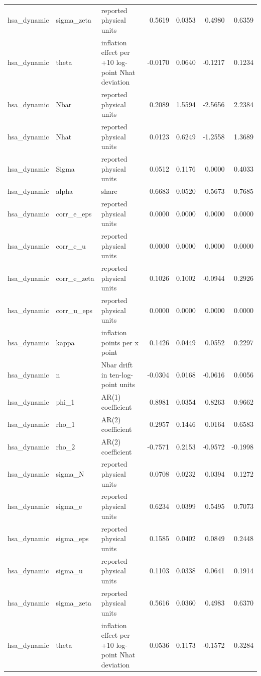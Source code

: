 \begin{tabular}{lllrrrr}
hsa\_dynamic & sigma\_zeta & reported physical units & 0.5619 & 0.0353 & 0.4980 & 0.6359 \\
hsa\_dynamic & theta & inflation effect per +10 log-point Nhat deviation & -0.0170 & 0.0640 & -0.1217 & 0.1234 \\
hsa\_dynamic & Nbar & reported physical units & 0.2089 & 1.5594 & -2.5656 & 2.2384 \\
hsa\_dynamic & Nhat & reported physical units & 0.0123 & 0.6249 & -1.2558 & 1.3689 \\
hsa\_dynamic & Sigma & reported physical units & 0.0512 & 0.1176 & 0.0000 & 0.4033 \\
hsa\_dynamic & alpha & share & 0.6683 & 0.0520 & 0.5673 & 0.7685 \\
hsa\_dynamic & corr\_e\_eps & reported physical units & 0.0000 & 0.0000 & 0.0000 & 0.0000 \\
hsa\_dynamic & corr\_e\_u & reported physical units & 0.0000 & 0.0000 & 0.0000 & 0.0000 \\
hsa\_dynamic & corr\_e\_zeta & reported physical units & 0.1026 & 0.1002 & -0.0944 & 0.2926 \\
hsa\_dynamic & corr\_u\_eps & reported physical units & 0.0000 & 0.0000 & 0.0000 & 0.0000 \\
hsa\_dynamic & kappa & inflation points per x point & 0.1426 & 0.0449 & 0.0552 & 0.2297 \\
hsa\_dynamic & n & Nbar drift in ten-log-point units & -0.0304 & 0.0168 & -0.0616 & 0.0056 \\
hsa\_dynamic & phi\_1 & AR(1) coefficient & 0.8981 & 0.0354 & 0.8263 & 0.9662 \\
hsa\_dynamic & rho\_1 & AR(2) coefficient & 0.2957 & 0.1446 & 0.0164 & 0.6583 \\
hsa\_dynamic & rho\_2 & AR(2) coefficient & -0.7571 & 0.2153 & -0.9572 & -0.1998 \\
hsa\_dynamic & sigma\_N & reported physical units & 0.0708 & 0.0232 & 0.0394 & 0.1272 \\
hsa\_dynamic & sigma\_e & reported physical units & 0.6234 & 0.0399 & 0.5495 & 0.7073 \\
hsa\_dynamic & sigma\_eps & reported physical units & 0.1585 & 0.0402 & 0.0849 & 0.2448 \\
hsa\_dynamic & sigma\_u & reported physical units & 0.1103 & 0.0338 & 0.0641 & 0.1914 \\
hsa\_dynamic & sigma\_zeta & reported physical units & 0.5616 & 0.0360 & 0.4983 & 0.6370 \\
hsa\_dynamic & theta & inflation effect per +10 log-point Nhat deviation & 0.0536 & 0.1173 & -0.1572 & 0.3284 \\

\end{tabular}
